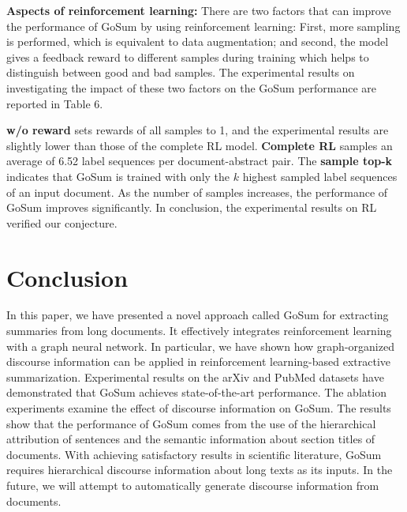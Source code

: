 \documentclass[11pt,a4paper]{article}
\begin{document}
\noindent \textbf{Aspects of reinforcement learning:}
There are two factors that can improve the performance of GoSum by using reinforcement learning: First, more sampling is performed, which is equivalent to data augmentation; and second, the model gives a feedback reward to different samples during training which helps to distinguish between good and bad samples. The experimental results on investigating the impact of these two factors on the GoSum performance are reported in Table 6. 

\textbf{w/o reward} sets rewards of all samples to 1, and the experimental results are slightly lower than those of the complete RL model.
\textbf{Complete RL} samples an average of 6.52 label sequences per document-abstract pair.
The \textbf{sample top-k} indicates that GoSum is trained with only the $k$ highest sampled label sequences of an input document.
As the number of samples increases, the  performance of GoSum improves significantly. In conclusion, the experimental results on RL verified our conjecture.



 

\section{Conclusion}
\label{sec:conclude}

In this paper, we have presented a novel approach called GoSum for extracting summaries from long documents. It effectively integrates reinforcement learning with a graph neural network. In particular, we have shown how graph-organized discourse information can  be applied in reinforcement learning-based extractive summarization.
Experimental results on the arXiv and PubMed datasets have demonstrated that GoSum achieves state-of-the-art performance. The ablation experiments examine the effect of discourse information on GoSum. The results show that the performance of GoSum comes from the use of the hierarchical attribution of sentences and the semantic information about section titles of documents.
With achieving satisfactory results in scientific literature, GoSum requires  hierarchical discourse information about long texts as its inputs. In the future, we will attempt to automatically generate discourse information from documents.
\end{document}
